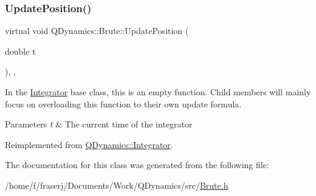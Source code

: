 \subsubsection{\texorpdfstring{Update\+Position()}{UpdatePosition()}}
{\footnotesize\ttfamily virtual void Q\+Dynamics\+::\+Brute\+::\+Update\+Position (\begin{DoxyParamCaption}\item[{double}]{t }\end{DoxyParamCaption})\hspace{0.3cm}{\ttfamily [inline]}, {\ttfamily [private]}, {\ttfamily [virtual]}}



In the \hyperlink{classQDynamics_1_1Integrator}{Integrator} base class, this is an empty function. Child members will mainly focus on overloading this function to their own update formula. 


\begin{DoxyParams}{Parameters}
{\em t} & The current time of the integrator \\
\hline
\end{DoxyParams}


Reimplemented from \hyperlink{classQDynamics_1_1Integrator_a4effa27d56f3205e53653b1fdc5cd08e}{Q\+Dynamics\+::\+Integrator}.



The documentation for this class was generated from the following file\+:\begin{DoxyCompactItemize}
\item 
/home/f/fraserj/\+Documents/\+Work/\+Q\+Dynamics/src/\hyperlink{Brute_8h}{Brute.\+h}\end{DoxyCompactItemize}
